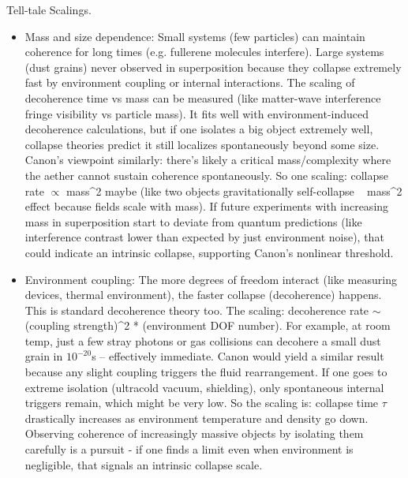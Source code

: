 \documentclass[11pt]{article}
\begin{document}
Tell-tale Scalings.


\begin{itemize}

\item 
Mass and size dependence: Small systems (few particles) can maintain coherence for long times (e.g. fullerene molecules interfere). Large systems (dust grains) never observed in superposition because they collapse extremely fast by environment coupling or internal interactions. The scaling of decoherence time vs mass can be measured (like matter-wave interference fringe visibility vs particle mass). It fits well with environment-induced decoherence calculations, but if one isolates a big object extremely well, collapse theories predict it still localizes spontaneously beyond some size. Canon’s viewpoint similarly: there's likely a critical mass/complexity where the aether cannot sustain coherence spontaneously. So one scaling: collapse rate $\propto$ mass^2 maybe (like two objects gravitationally self-collapse ~ mass^2 effect because fields scale with mass). If future experiments with increasing mass in superposition start to deviate from quantum predictions (like interference contrast lower than expected by just environment noise), that could indicate an intrinsic collapse, supporting Canon’s nonlinear threshold.




\item 
Environment coupling: The more degrees of freedom interact (like measuring devices, thermal environment), the faster collapse (decoherence) happens. This is standard decoherence theory too. The scaling: decoherence rate $\sim$ (coupling strength)^2 * (environment DOF number). For example, at room temp, just a few stray photons or gas collisions can decohere a small dust grain in $10^{-20}$s – effectively immediate. Canon would yield a similar result because any slight coupling triggers the fluid rearrangement. If one goes to extreme isolation (ultracold vacuum, shielding), only spontaneous internal triggers remain, which might be very low. So the scaling is: collapse time $\tau$ drastically increases as environment temperature and density go down. Observing coherence of increasingly massive objects by isolating them carefully is a pursuit - if one finds a limit even when environment is negligible, that signals an intrinsic collapse scale.





\end{itemize}
\end{document}
